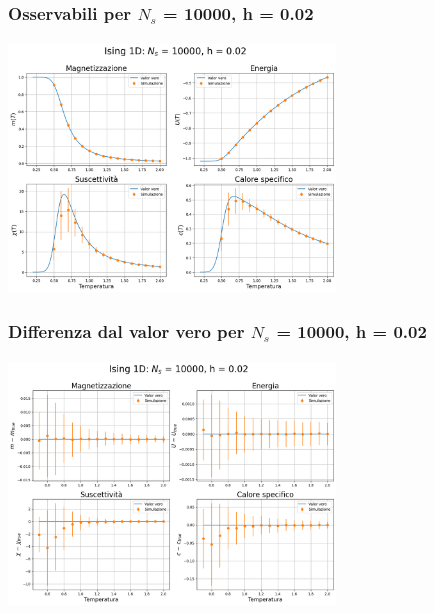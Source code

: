 \begin{frame}
    \frametitle{Osservabili per $N_s$ = 10000, h = 0.02}
    \framesubtitle{}

    \centering
    \includegraphics[width=0.65\textwidth]{Immagini/backupIsing1D/obs_10000_0.02.png}

\end{frame}



\begin{frame}
    \frametitle{Differenza dal valor vero per $N_s$ = 10000, h = 0.02}
    \framesubtitle{}

    \centering
    \includegraphics[width=0.65\textwidth]{Immagini/backupIsing1D/obs_10000_0.02_diff.png}

\end{frame}
